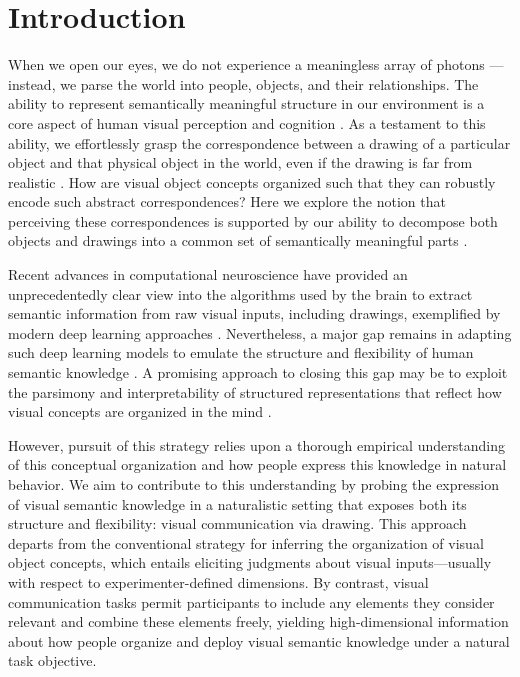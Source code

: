 \documentclass[10pt,letterpaper]{article}
\begin{document}
\section{Introduction}


When we open our eyes, we do not experience a meaningless array of photons --- instead, we parse the world into people, objects, and their relationships. 
The ability to represent semantically meaningful structure in our environment is a core aspect of human visual perception and cognition \cite{navon1977forest}. 
As a testament to this ability, we effortlessly grasp the correspondence between a drawing of a particular object and that physical object in the world, even if the drawing is far from realistic \cite{eitz2012humans}. 
How are visual object concepts organized such that they can robustly encode such abstract correspondences?
Here we explore the notion that perceiving these correspondences is supported by our ability to decompose both objects and drawings into a common set of semantically meaningful parts \cite{biederman1988surface}. 

Recent advances in computational neuroscience have provided an unprecedentedly clear view into the algorithms used by the brain to extract semantic information from raw visual inputs, including drawings, exemplified by modern deep learning approaches \cite{yamins2014performance}.
Nevertheless, a major gap remains in adapting such deep learning models to emulate the structure and flexibility of human semantic knowledge \cite{lake2017building}.
A promising approach to closing this gap may be to exploit the parsimony and interpretability of structured representations that reflect how visual concepts are organized in the mind \cite{battaglia2018relational}.

However, pursuit of this strategy relies upon a thorough empirical understanding of this conceptual organization and how people express this knowledge in natural behavior. 
We aim to contribute to this understanding by probing the expression of visual semantic knowledge in a naturalistic setting that exposes both its structure and flexibility: visual communication via drawing. 
This approach departs from the conventional strategy for inferring the organization of visual object concepts, which entails eliciting judgments about visual inputs---usually with respect to experimenter-defined dimensions. 
By contrast, visual communication tasks permit participants to include any elements they consider relevant and combine these elements freely, yielding high-dimensional information about how people organize and deploy visual semantic knowledge under a natural task objective. 
\end{document}
